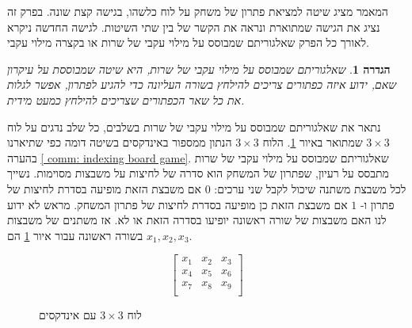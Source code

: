 \documentclass[12pt,leqno]{article}
\theoremstyle{theoremdd}
\newtheorem{definition}{הגדרה}[section]
\begin{document}
המאמר 
\cite{B1}
מציג שיטה למציאת פתרון
של משחק על לוח כלשהו,
בגישה קצת שונה.
בפרק זה נציג את הגישה שמתוארת 
\cite{B1}
ונראה את הקשר של בין שתי השיטות.
לגישה החדשה ניקרא לאורך כל הפרק שאלגוריתם שמבוסס על מילוי עקבי של שרות
או בקצרה מילוי עקבי.
\begin{definition}
    \label{def: spanish way}
    שאלגוריתם שמבוסס על מילוי עקבי של שרות, היא שיטה שמבוססת על עיקרון 
    שאם, ידוע איזה כפתורים צריכים להילחץ בשורה העליונה כדי להגיע לפתרון, אפשר לגלות את כל שאר הכפתורים שצריכים להילחץ 
    כמעט מידית.
\end{definition}
נתאר את 
שאלגוריתם שמבוסס על מילוי עקבי של שרות
בשלבים,
כל שלב נדגים
על לוח 
$3 \times 3$
שמתואר באיור 
\ref{fig: 3 x 3 board indexed}.
הלוח 
$3 \times 3$
הנתון ממספור באינדקסים 
בשיטה דומה כפי שתיארנו בהערה 
\ref{ comm: indexing board game}.
שאלגוריתם שמבוסס על מילוי עקבי של שרות
מתבסס על רעיון,
שפתרון של המשחק הוא סדרה של לחיצות על משבצות מסוימות. נשייך
 לכל משבצת משתנה שיכול לקבל שני ערכים: 
 $0$
  אם משבצת הזאת מופיעה בסדרת לחיצות של פתרון
 ו-
 $1$
 אם משבצת הזאת כן מופיעה בסדרת לחיצות של פתרון המשחק.
  מראש לא ידוע לנו
 האם משבצות של שורה ראשונה יופיעו בסדרה הזאת או לא. אז משתנים של משבצות בשורה ראשונה
 עבור
 איור 
 \ref{fig: 3 x 3 board indexed}
 הם
 $x_1, x_2, x_3$.

\begin{figure}[ht]
    \caption{לוח 
    $3 \times 3$
    עם אינדקסים}
    \label{fig: 3 x 3 board indexed}
    \centering
    \[\begin{bmatrix}
        x_1 & x_2 & x_3 \\
        x_4 & x_5 & x_6 \\
        x_7 & x_8 & x_9 \\
    \end{bmatrix}    
    \]
\end{figure}
\end{document}
